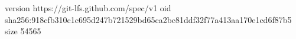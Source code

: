version https://git-lfs.github.com/spec/v1
oid sha256:918cfb310c1c695d247b721529bd65ca2bc81ddf32f77a413aa170e1cd6f87b5
size 54565
